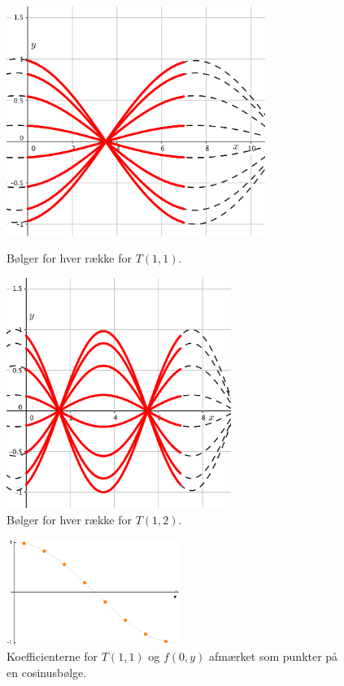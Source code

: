 \begin{figure}[!h]
\begin{minipage}[b]{0.5\linewidth}
\centering
\includegraphics[width=0.75\textwidth]{Billeder/Frekvens-eksempelu1v1.png}
\caption{Bølger for hver række for $T(1,1)$.} %
\label{fig:frekeksu1v1}
\end{minipage}
\begin{minipage}[b]{0.5\linewidth}
\centering
\includegraphics[width=0.65\textwidth]{Billeder/Frekvens-eksempelu1v2.png}
\caption{Bølger for hver række for $T(1,2)$.}
\label{fig:frekeksu1v2}
\end{minipage}
\end{figure}

\begin{figure}[htbp]
\centering
\includegraphics[width=0.5\textwidth]{Billeder/coskoefficienter.png}
\caption{Koefficienterne for $T(1,1)$ og $f(0,y)$ afmærket som punkter på en cosinusbølge.}
\label{fig:cosko}
\end{figure}

